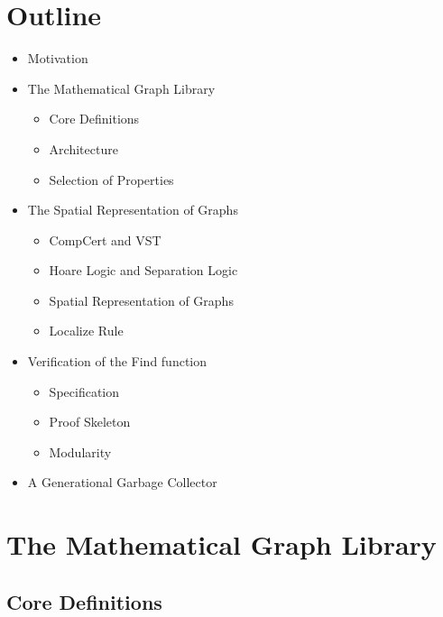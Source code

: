 \documentclass[professionalfonts, xcolor=table]{beamer}
\begin{document}
\section{Outline}
\begin{frame}
  \begin{itemize}
  \item Motivation \hspace{1ex}\alert{\Large\checkmark}
  \item The Mathematical Graph Library
    \begin{itemize}
    \item Core Definitions
    \item Architecture
    \item Selection of Properties
    \end{itemize}
  \item The Spatial Representation of Graphs
    \begin{itemize}
    \item CompCert and VST
    \item Hoare Logic and Separation Logic
    \item Spatial Representation of Graphs
    \item Localize Rule
    \end{itemize}
  \item Verification of the Find function
    \begin{itemize}
    \item Specification
    \item Proof Skeleton
    \item Modularity
    \end{itemize}
  \item A Generational Garbage Collector
  \end{itemize}
\end{frame}

\section{The Mathematical Graph Library}
\subsection{Core Definitions}
\end{document}
